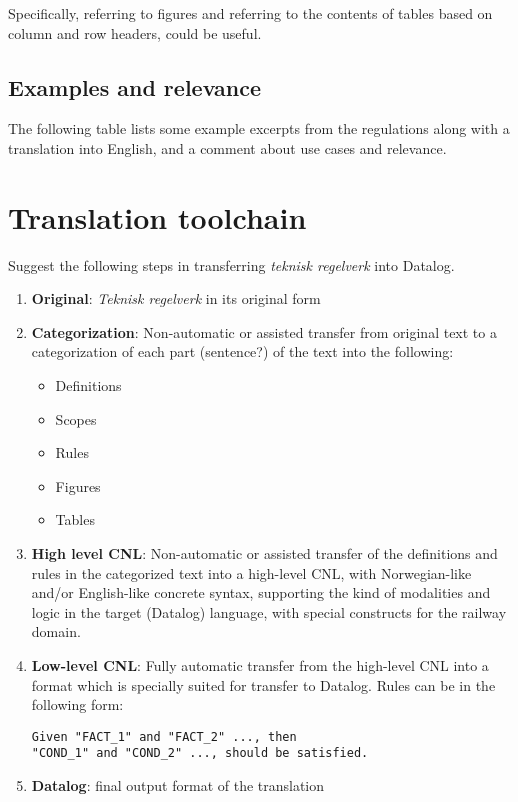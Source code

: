\documentclass[]{article}
\providecommand{\tightlist}{%
  \setlength{\itemsep}{0pt}\setlength{\parskip}{0pt}}
\begin{document}
Specifically, referring to figures and referring to the contents of
tables based on column and row headers, could be useful.

\subsection{Examples and relevance}\label{examples-and-relevance}

The following table lists some example excerpts from the regulations
along with a translation into English, and a comment about use cases and
relevance.



\section{Translation toolchain}\label{translation-toolchain}

Suggest the following steps in transferring \emph{teknisk regelverk}
into Datalog.

\begin{enumerate}
\def\labelenumi{\arabic{enumi}.}
\item
  \textbf{Original}: \emph{Teknisk regelverk} in its original form
\item
  \textbf{Categorization}: Non-automatic or assisted transfer from
  original text to a categorization of each part (sentence?) of the text
  into the following:

  \begin{itemize}
  \tightlist
  \item
    Definitions
  \item
    Scopes
  \item
    Rules
  \item
    Figures
  \item
    Tables
  \end{itemize}
\item
  \textbf{High level CNL}: Non-automatic or assisted transfer of the
  definitions and rules in the categorized text into a high-level CNL,
  with Norwegian-like and/or English-like concrete syntax, supporting
  the kind of modalities and logic in the target (Datalog) language,
  with special constructs for the railway domain.
\item
  \textbf{Low-level CNL}: Fully automatic transfer from the high-level
  CNL into a format which is specially suited for transfer to Datalog.
  Rules can be in the following form:

\begin{verbatim}
Given "FACT_1" and "FACT_2" ..., then
"COND_1" and "COND_2" ..., should be satisfied.
\end{verbatim}
\item
  \textbf{Datalog}: final output format of the translation
\end{enumerate}
\end{document}
